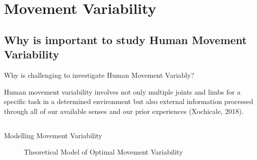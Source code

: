 \section{Movement Variability}




\subsection{Why is important to study Human Movement Variability}
{

\begin{frame}{Why is challenging to investigate Human Movement Variably?}

\Large
Human movement variability involves not only multiple joints and limbs for
a specific task in a determined environment  but also 
external information processed through all of our
available senses and our prior experiences (Xochicale, 2018).

\end{frame}
}



\subsection{}
{
\begin{frame}{Modelling Movement Variability}
    \begin{figure}
	\caption{Theoretical Model of Optimal Movement Variability} 
   \end{figure}
\end{frame}
}





